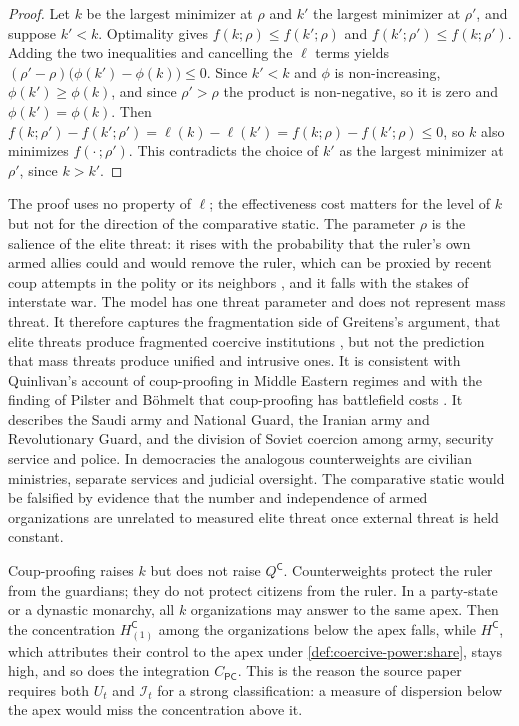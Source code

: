 \documentclass[11pt,letterpaper]{article}
\theoremstyle{definition}
\theoremstyle{remark}
\newcommand{\pP}{\mathsf{P}}
\newcommand{\pC}{\mathsf{C}}
\newcommand{\Integ}{\mathcal{I}}
\begin{document}
\begin{proof}
Let $k$ be the largest minimizer at $\rho$ and $k'$ the largest minimizer at $\rho'$, and suppose $k' < k$. Optimality gives $f(k; \rho) \le f(k'; \rho)$ and $f(k'; \rho') \le f(k; \rho')$. Adding the two inequalities and cancelling the $\ell$ terms yields $(\rho' - \rho)\bigl(\phi(k') - \phi(k)\bigr) \le 0$. Since $k' < k$ and $\phi$ is non-increasing, $\phi(k') \ge \phi(k)$, and since $\rho' > \rho$ the product is non-negative, so it is zero and $\phi(k') = \phi(k)$. Then $f(k; \rho') - f(k'; \rho') = \ell(k) - \ell(k') = f(k; \rho) - f(k'; \rho) \le 0$, so $k$ also minimizes $f(\cdot\,; \rho')$. This contradicts the choice of $k'$ as the largest minimizer at $\rho'$, since $k > k'$.
\end{proof}

The proof uses no property of $\ell$; the effectiveness cost matters for the level of $k$ but not for the direction of the comparative static. The parameter $\rho$ is the salience of the elite threat: it rises with the probability that the ruler's own armed allies could and would remove the ruler, which can be proxied by recent coup attempts in the polity or its neighbors \citep{powell2011}, and it falls with the stakes of interstate war. The model has one threat parameter and does not represent mass threat. It therefore captures the fragmentation side of Greitens's argument, that elite threats produce fragmented coercive institutions \citep{greitens2016}, but not the prediction that mass threats produce unified and intrusive ones. It is consistent with Quinlivan's account of coup-proofing in Middle Eastern regimes \citep{quinlivan1999} and with the finding of Pilster and B\"ohmelt that coup-proofing has battlefield costs \citep{pilster2011}. It describes the Saudi army and National Guard, the Iranian army and Revolutionary Guard, and the division of Soviet coercion among army, security service and police. In democracies the analogous counterweights are civilian ministries, separate services and judicial oversight. The comparative static would be falsified by evidence that the number and independence of armed organizations are unrelated to measured elite threat once external threat is held constant.

Coup-proofing raises $k$ but does not raise $Q^{\pC}$. Counterweights protect the ruler from the guardians; they do not protect citizens from the ruler. In a party-state or a dynastic monarchy, all $k$ organizations may answer to the same apex. Then the concentration $H^{\pC}_{(1)}$ among the organizations below the apex falls, while $H^{\pC}$, which attributes their control to the apex under \cref{def:coercive-power:share}, stays high, and so does the integration $C_{\pP\pC}$. This is the reason the source paper requires both $U_t$ and $\Integ_t$ for a strong classification: a measure of dispersion below the apex would miss the concentration above it.
\end{document}
